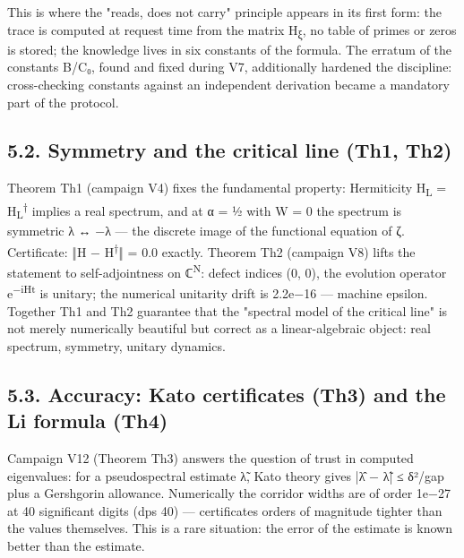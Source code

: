 \documentclass[11pt,a4paper]{article}
\begin{document}
This is where the "reads, does not carry" principle appears in its first form: the trace is computed at request time from the matrix H\textsubscript{ξ}, no table of primes or zeros is stored; the knowledge lives in six constants of the formula. The erratum of the constants B/C₀, found and fixed during V7, additionally hardened the discipline: cross-checking constants against an independent derivation became a mandatory part of the protocol.

\begin{center}\end{center}

\subsection{5.2. Symmetry and the critical line (Th1, Th2)}

Theorem Th1 (campaign V4) fixes the fundamental property: Hermiticity H\textsubscript{L} = H\textsubscript{L}\textsuperscript{†} implies a real spectrum, and at α = ½ with W = 0 the spectrum is symmetric λ ↔ −λ — the discrete image of the functional equation of ζ. Certificate: ‖H − H\textsuperscript{†}‖ = 0.0 exactly. Theorem Th2 (campaign V8) lifts the statement to self-adjointness on ℂ\textsuperscript{N}: defect indices (0, 0), the evolution operator e\textsuperscript{−iHt} is unitary; the numerical unitarity drift is 2.2e−16 — machine epsilon. Together Th1 and Th2 guarantee that the "spectral model of the critical line" is not merely numerically beautiful but correct as a linear-algebraic object: real spectrum, symmetry, unitary dynamics.

\subsection{5.3. Accuracy: Kato certificates (Th3) and the Li formula (Th4)}

Campaign V12 (Theorem Th3) answers the question of trust in computed eigenvalues: for a pseudospectral estimate λ̃, Kato theory gives |λ̂ − λ̃| ≤ δ²/gap plus a Gershgorin allowance. Numerically the corridor widths are of order 1e−27 at 40 significant digits (dps 40) — certificates orders of magnitude tighter than the values themselves. This is a rare situation: the error of the estimate is known better than the estimate.
\end{document}
